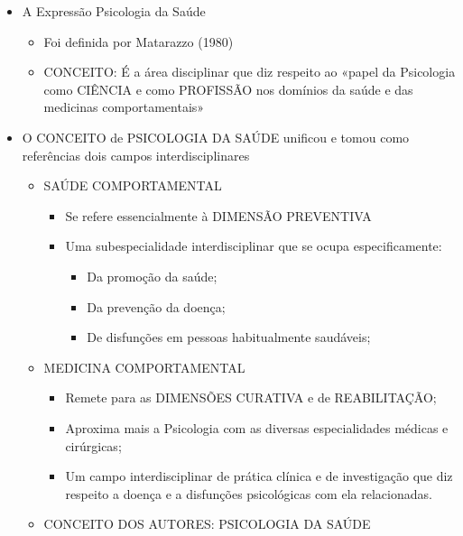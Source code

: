 \documentclass[
]{book}
\providecommand{\tightlist}{%
  \setlength{\itemsep}{0pt}\setlength{\parskip}{0pt}}
\begin{document}
\begin{itemize}
\tightlist
\item
  A Expressão Psicologia da Saúde

  \begin{itemize}
  \tightlist
  \item
    Foi definida por Matarazzo (1980)
  \item
    CONCEITO: É a área disciplinar que diz respeito ao «papel da
    Psicologia como CIÊNCIA e como PROFISSÃO nos domínios da saúde e das
    medicinas comportamentais»
  \end{itemize}
\item
  O CONCEITO de PSICOLOGIA DA SAÚDE unificou e tomou como referências
  dois campos interdisciplinares

  \begin{itemize}
  \tightlist
  \item
    SAÚDE COMPORTAMENTAL

    \begin{itemize}
    \tightlist
    \item
      Se refere essencialmente à DIMENSÃO PREVENTIVA
    \item
      Uma subespecialidade interdisciplinar que se ocupa
      especificamente:

      \begin{itemize}
      \tightlist
      \item
        Da promoção da saúde;
      \item
        Da prevenção da doença;
      \item
        De disfunções em pessoas habitualmente saudáveis;
      \end{itemize}
    \end{itemize}
  \item
    MEDICINA COMPORTAMENTAL

    \begin{itemize}
    \tightlist
    \item
      Remete para as DIMENSÕES CURATIVA e de REABILITAÇÃO;
    \item
      Aproxima mais a Psicologia com as diversas especialidades médicas
      e cirúrgicas;
    \item
      Um campo interdisciplinar de prática clínica e de investigação que
      diz respeito a doença e a disfunções psicológicas com ela
      relacionadas.
    \end{itemize}
  \item
    CONCEITO DOS AUTORES: PSICOLOGIA DA SAÚDE


\end{itemize}
\end{itemize}
\end{document}
